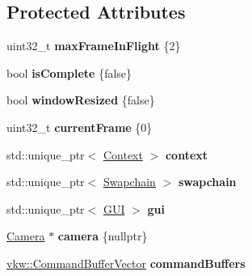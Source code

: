 \subsection*{Protected Attributes}
\begin{DoxyCompactItemize}
\item 
\mbox{\label{classblaze_1_1ARenderer_a1d729975bd96063dfbd3821a4bc222a1}} 
uint32\+\_\+t {\bfseries max\+Frame\+In\+Flight} \{2\}
\item 
\mbox{\label{classblaze_1_1ARenderer_a920af9542eed368dfd37523f7584a6ba}} 
bool {\bfseries is\+Complete} \{false\}
\item 
\mbox{\label{classblaze_1_1ARenderer_ae3afe1ea7a452bb0ec29c210639b56b0}} 
bool {\bfseries window\+Resized} \{false\}
\item 
\mbox{\label{classblaze_1_1ARenderer_a79cf50d4481bfb4a21d57fa5c4ddfc93}} 
uint32\+\_\+t {\bfseries current\+Frame} \{0\}
\item 
\mbox{\label{classblaze_1_1ARenderer_a4ffd40adc9cabeda6612b7cdaa0f399e}} 
std\+::unique\+\_\+ptr$<$ \hyperlink{classblaze_1_1Context}{Context} $>$ {\bfseries context}
\item 
\mbox{\label{classblaze_1_1ARenderer_a0c22712edcd9d888fe0756db095d1593}} 
std\+::unique\+\_\+ptr$<$ \hyperlink{classblaze_1_1Swapchain}{Swapchain} $>$ {\bfseries swapchain}
\item 
\mbox{\label{classblaze_1_1ARenderer_a20d9e0ae9052051bb130435aee323861}} 
std\+::unique\+\_\+ptr$<$ \hyperlink{classblaze_1_1GUI}{G\+UI} $>$ {\bfseries gui}
\item 
\mbox{\label{classblaze_1_1ARenderer_a66f91ba2792d8678a15c3ce6e64df353}} 
\hyperlink{classblaze_1_1Camera}{Camera} $\ast$ {\bfseries camera} \{nullptr\}
\item 
\mbox{\label{classblaze_1_1ARenderer_ac7a96d61032c07c7166720a80b68c81e}} 
\hyperlink{structblaze_1_1vkw_1_1CommandBufferVector}{vkw\+::\+Command\+Buffer\+Vector} {\bfseries command\+Buffers}

\end{DoxyCompactItemize}
